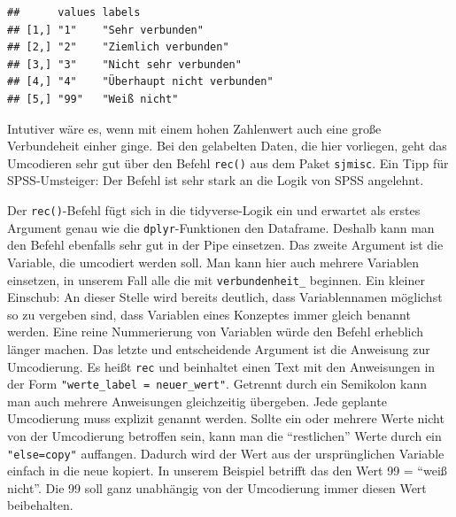 \documentclass[
]{book}
\newenvironment{Shaded}{\begin{snugshade}}{\end{snugshade}}
\newcommand{\CommentTok}[1]{\textcolor[rgb]{0.56,0.35,0.01}{\textit{#1}}}
\newcommand{\FunctionTok}[1]{\textcolor[rgb]{0.00,0.00,0.00}{#1}}
\newcommand{\NormalTok}[1]{#1}
\newcommand{\OtherTok}[1]{\textcolor[rgb]{0.56,0.35,0.01}{#1}}
\newcommand{\SpecialCharTok}[1]{\textcolor[rgb]{0.00,0.00,0.00}{#1}}
\begin{document}
\begin{Shaded}
\end{Shaded}

\begin{verbatim}
##      values labels                     
## [1,] "1"    "Sehr verbunden"           
## [2,] "2"    "Ziemlich verbunden"       
## [3,] "3"    "Nicht sehr verbunden"     
## [4,] "4"    "Überhaupt nicht verbunden"
## [5,] "99"   "Weiß nicht"
\end{verbatim}

Intutiver wäre es, wenn mit einem hohen Zahlenwert auch eine große Verbundeheit einher ginge. Bei den gelabelten Daten, die hier vorliegen, geht das Umcodieren sehr gut über den Befehl \texttt{rec()} aus dem Paket \texttt{sjmisc}. Ein Tipp für SPSS-Umsteiger: Der Befehl ist sehr stark an die Logik von SPSS angelehnt.

Der \texttt{rec()}-Befehl fügt sich in die tidyverse-Logik ein und erwartet als erstes Argument genau wie die \texttt{dplyr}-Funktionen den Dataframe. Deshalb kann man den Befehl ebenfalls sehr gut in der Pipe einsetzen. Das zweite Argument ist die Variable, die umcodiert werden soll. Man kann hier auch mehrere Variablen einsetzen, in unserem Fall alle die mit \texttt{verbundenheit\_} beginnen. Ein kleiner Einschub: An dieser Stelle wird bereits deutlich, dass Variablennamen möglichst so zu vergeben sind, dass Variablen eines Konzeptes immer gleich benannt werden. Eine reine Nummerierung von Variablen würde den Befehl erheblich länger machen.
Das letzte und entscheidende Argument ist die Anweisung zur Umcodierung. Es heißt \texttt{rec} und beinhaltet einen Text mit den Anweisungen in der Form \texttt{"werte\_label\ =\ neuer\_wert"}. Getrennt durch ein Semikolon kann man auch mehrere Anweisungen gleichzeitig übergeben. Jede geplante Umcodierung muss explizit genannt werden. Sollte ein oder mehrere Werte nicht von der Umcodierung betroffen sein, kann man die ``restlichen'' Werte durch ein \texttt{"else=copy"} auffangen. Dadurch wird der Wert aus der ursprünglichen Variable einfach in die neue kopiert. In unserem Beispiel betrifft das den Wert 99 = ``weiß nicht''. Die 99 soll ganz unabhängig von der Umcodierung immer diesen Wert beibehalten.
\end{document}
